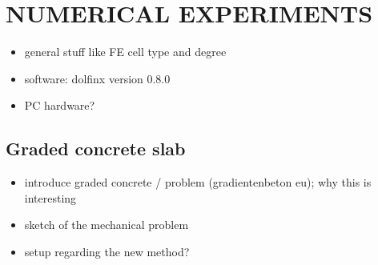 \documentclass[a4paper]{eccomas_paper-2024}
\begin{document}

\section{NUMERICAL EXPERIMENTS} %
\label{sec:numerical experiments}

\begin{itemize}
    \item general stuff like FE cell type and degree
    \item software: dolfinx version 0.8.0
    \item PC hardware?
\end{itemize}


\subsection{Graded concrete slab} %
\label{sub:Graded concrete slab}

\begin{itemize}
    \item introduce graded concrete / problem (gradientenbeton eu); why this is interesting
    \item sketch of the mechanical problem
    \item setup regarding the new method?
\end{itemize}

%
%
%
\end{document}
